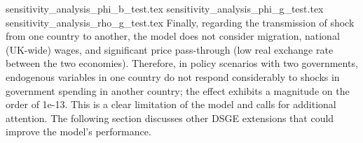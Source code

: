 {sensitivity_analysis_phi_b_test.tex}
{sensitivity_analysis_phi_g_test.tex}
{sensitivity_analysis_rho_g_test.tex}
Finally, regarding the transmission of shock from one country to another, the model does not consider migration, national (UK-wide) wages, and significant price pass-through (low real exchange rate between the two economies). Therefore, in policy scenarios with two governments, endogenous variables in one country do not respond considerably to shocks in government spending in another country; the effect exhibits a magnitude on the order of 1e-13. This is a clear limitation of the model and calls for additional attention. The following section discusses other DSGE extensions that could improve the model's performance.

